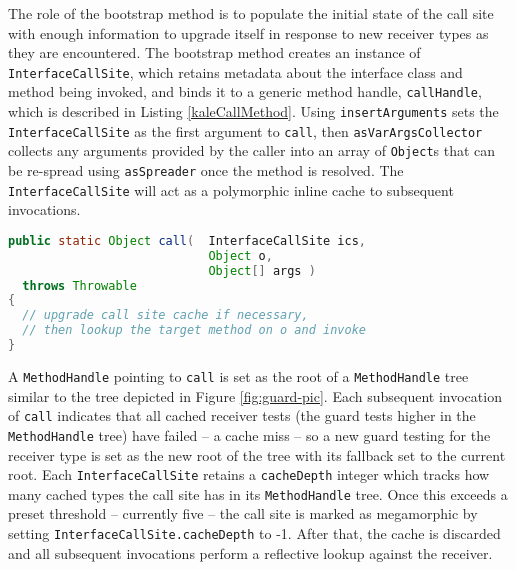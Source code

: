 The role of the bootstrap method is to populate the initial state of the call site with enough information to upgrade itself in response to new receiver types as they are encountered.  The bootstrap method creates an instance of \texttt{InterfaceCallSite}, which retains metadata about the interface class and method being invoked, and binds it to a generic method handle, \texttt{callHandle}, which is described in Listing \ref{kaleCallMethod}.  Using \texttt{insertArguments} sets the \texttt{InterfaceCallSite} as the first argument to \texttt{call}, then \texttt{asVarArgsCollector} collects any arguments provided by the caller into an array of \texttt{Object}s that can be re-spread using \texttt{asSpreader} once the method is resolved.  The \texttt{InterfaceCallSite} will act as a polymorphic inline cache to subsequent invocations.

\begin{lstlisting}[language=Java,caption=Generalized interface invoker method,label=kaleCallMethod]
public static Object call(	InterfaceCallSite ics,
                            Object o,
                            Object[] args )
  throws Throwable
{
  // upgrade call site cache if necessary,
  // then lookup the target method on o and invoke
}
\end{lstlisting}

A \texttt{MethodHandle} pointing to \texttt{call} is set as the root of a \texttt{MethodHandle} tree similar to the tree depicted in Figure \ref{fig:guard-pic}.  Each subsequent invocation of \texttt{call} indicates that all cached receiver tests (the guard tests higher in the \texttt{MethodHandle} tree) have failed -- a cache miss -- so a new guard testing for the receiver type is set as the new root of the tree with its fallback set to the current root.  Each \texttt{InterfaceCallSite} retains a \texttt{cacheDepth} integer which tracks how many cached types the call site has in its \texttt{MethodHandle} tree.  Once this exceeds a preset threshold -- currently five -- the call site is marked as megamorphic by setting \texttt{InterfaceCallSite.cacheDepth} to -1.  After that, the cache is discarded and all subsequent invocations perform a reflective lookup against the receiver.


